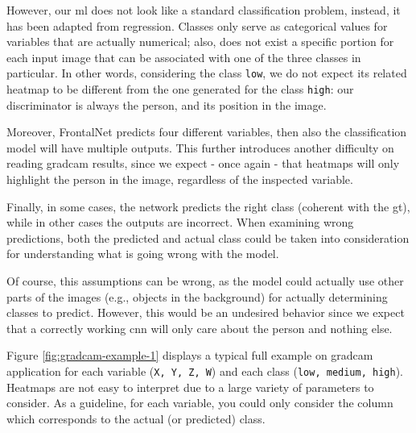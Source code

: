 \medskip

However, our \gls{ml} does not look like a standard classification problem, instead, it has been adapted from regression. Classes only serve as categorical values for variables that are actually numerical; also, does not exist a specific portion for each input image that can be associated with one of the three classes in particular. In other words, considering the class \texttt{low}, we do not expect its related heatmap to be different from the one generated for the class \texttt{high}: our discriminator is always the person, and its position in the image.

Moreover, FrontalNet predicts four different variables, then also the classification model will have multiple outputs. This further introduces another difficulty on reading \gls{gradcam} results, since we expect - once again - that heatmaps will only highlight the person in the image, regardless of the inspected variable.

Finally, in some cases, the network predicts the right class (coherent with the \gls{gt}), while in other cases the outputs are incorrect. When examining wrong predictions, both the predicted and actual class could be taken into consideration for understanding what is going wrong with the model.

Of course, this assumptions can be wrong, as the model could actually use other parts of the images (e.g., objects in the background) for actually determining classes to predict. However, this would be an undesired behavior since we expect that a correctly working \gls{cnn} will only care about the person and nothing else.

\bigskip

Figure \ref{fig:gradcam-example-1} displays a typical full example on \gls{gradcam} application for each variable (\texttt{X, Y, Z, W}) and each class (\texttt{low, medium, high}). Heatmaps are not easy to interpret due to a large variety of parameters to consider. As a guideline, for each variable, you could only consider the column which corresponds to the actual (or predicted) class.

